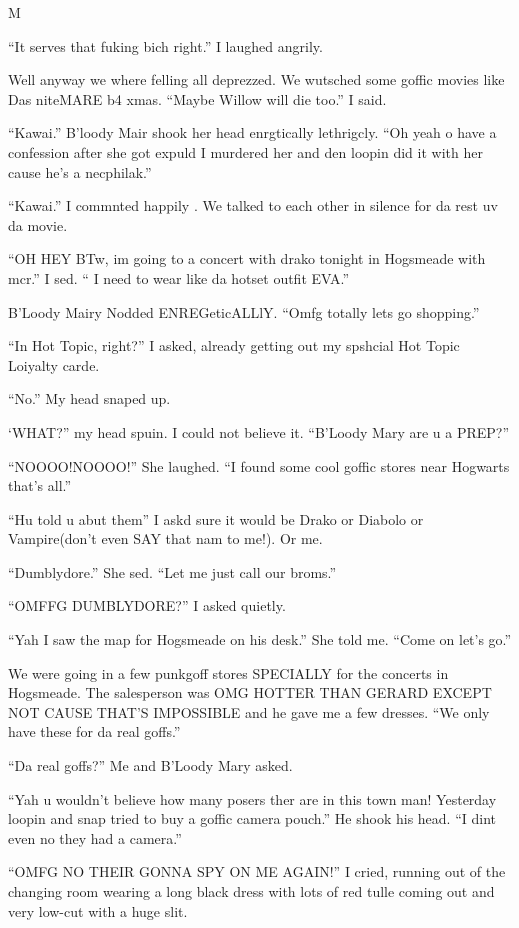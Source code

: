M\documentclass{article}
\begin{document}
“It serves that fuking bich right.” I laughed angrily.

Well anyway we where felling all deprezzed. We wutsched some goffic movies like Das niteMARE b4 xmas. “Maybe Willow will die too.” I said.

“Kawai.” B’loody Mair shook her head enrgtically lethrigcly. “Oh yeah o have a confession after she got expuld I murdered her and den loopin did it with her cause he’s a necphilak.”

“Kawai.” I commnted happily . We talked to each other in silence for da rest uv da movie.

“OH HEY BTw, im going to a concert with drako tonight in Hogsmeade with mcr.” I sed. “ I need to wear like da hotset outfit EVA.”

B’Loody Mairy Nodded ENREGeticALLlY. “Omfg totally lets go shopping.”

“In Hot Topic, right?” I asked, already getting out my spshcial Hot Topic Loiyalty carde.

“No.” My head snaped up.

‘WHAT?” my head spuin. I could not believe it. “B’Loody Mary are u a PREP?”

“NOOOO!NOOOO!” She laughed. “I found some cool goffic stores near Hogwarts that’s all.”

“Hu told u abut them” I askd sure it would be Drako or Diabolo or Vampire(don’t even SAY that nam to me!). Or me.

“Dumblydore.” She sed. “Let me just call our broms.”

“OMFFG DUMBLYDORE?” I asked quietly.

“Yah I saw the map for Hogsmeade on his desk.” She told me. “Come on let’s go.”

We were going in a few punkgoff stores SPECIALLY for the concerts in Hogsmeade. The salesperson was OMG HOTTER THAN GERARD EXCEPT NOT CAUSE THAT’S IMPOSSIBLE and he gave me a few dresses. “We only have these for da real goffs.”

“Da real goffs?” Me and B’Loody Mary asked.

“Yah u wouldn’t believe how many posers ther are in this town man! Yesterday loopin and snap tried to buy a goffic camera pouch.” He shook his head. “I dint even no they had a camera.”

“OMFG NO THEIR GONNA SPY ON ME AGAIN!” I cried, running out of the changing room wearing a long black dress with lots of red tulle coming out and very low-cut with a huge slit.
\end{document}
